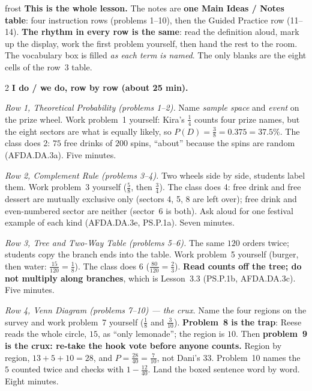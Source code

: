\documentclass[10pt]{article}
\begin{document}
\boxguard
\begin{skillbox}{frost}
\textbf{This is the whole lesson.} The notes are \textbf{one Main Ideas / Notes table}: four
instruction rows (problems 1--10), then the Guided Practice row (11--14). \textbf{The rhythm in
every row is the same}: read the definition aloud, mark up the display, work the first problem
yourself, then hand the rest to the room. The vocabulary box is filled \emph{as each term is
named}. The only blanks are the eight cells of the row~3 table.
\begin{multicols}{2}
\textbf{I do / we do, row by row (about 25 min).}

\emph{Row 1, Theoretical Probability (problems 1--2).} Name \emph{sample space} and \emph{event}
on the prize wheel. Work problem~1 yourself: Kira's $\frac14$ counts four prize names, but the
eight sectors are what is equally likely, so $P(D) = \frac38 = 0.375 = 37.5\%$. The class does 2:
$75$ free drinks of $200$ spins, ``about'' because the spins are random (AFDA.DA.3a). Five minutes.

\emph{Row 2, Complement Rule (problems 3--4).} Two wheels side by side, students label them.
Work problem~3 yourself ($\frac58$, then $\frac34$). The class does 4: free drink and free dessert
are mutually exclusive only (sectors 4, 5, 8 are left over); free drink and even-numbered sector
are neither (sector~6 is both). Ask aloud for one festival example of each kind (AFDA.DA.3e,
PS.P.1a). Seven minutes.

\emph{Row 3, Tree and Two-Way Table (problems 5--6).} The same $120$ orders twice; students copy
the branch ends into the table. Work problem~5 yourself (burger, then water: $\frac{15}{120} =
\frac18$). The class does 6 ($\frac{80}{120} = \frac23$). \textbf{Read counts off the tree; do not
multiply along branches}, which is Lesson~3.3 (PS.P.1b, AFDA.DA.3c). Five minutes.

\emph{Row 4, Venn Diagram (problems 7--10) --- the crux.} Name the four regions on the survey and
work problem~7 yourself ($\frac18$ and $\frac{3}{10}$). \textbf{Problem~8 is the trap}: Reese reads
the whole circle, $15$, as ``only lemonade''; the region is $10$. Then \textbf{problem~9 is the
crux: re-take the hook vote before anyone counts.} Region by region, $13 + 5 + 10 = 28$, and
$P = \frac{28}{40} = \frac{7}{10}$, not Dani's $33$. Problem~10 names the $5$ counted twice and
checks with $1 - \frac{12}{40}$. Land the boxed sentence word by word. Eight minutes.


\end{multicols}
\end{skillbox}
\end{document}
